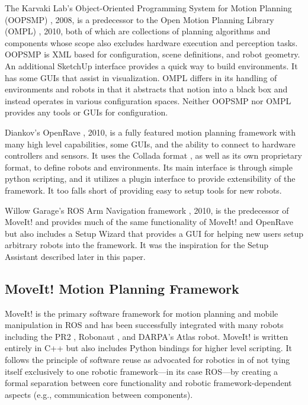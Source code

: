 \documentclass[10pt,journal,compsoc]{joser1}
\begin{document}
{The Karvaki Lab's Object-Oriented Programming System for Motion Planning
(OOPSMP) \cite{oopsmp}, 2008, is a predecessor to the Open Motion Planning
Library (OMPL) \cite{sucan2012the-open-motion-planning-library}, 2010, both of
which are collections of planning algorithms and components whose scope also
excludes hardware execution and perception tasks. OOPSMP is XML based for
configuration, scene definitions, and robot geometry. An additional SketchUp
interface provides a quick way to build environments. It has some GUIs that
assist in visualization. OMPL differs in its handling of environments and robots
in that it abstracts that notion into a black box and instead operates in
various configuration spaces. Neither OOPSMP nor OMPL provides any tools or GUIs
for configuration.

Diankov's OpenRave \cite{diankov2008openrave}, 2010, is a fully featured motion
planning framework with many high level capabilities, some GUIs, and the ability
to connect to hardware controllers and sensors. It uses the Collada format
\cite{collada}, as well as its own proprietary format, to define robots and
environments. Its main interface is through simple python scripting, and it
utilizes a plugin interface to provide extensibility of the framework. It too
falls short of providing easy to setup tools for new robots. 

Willow Garage's ROS Arm Navigation framework \cite{chitta2012perception}, 2010,
is the predecessor of MoveIt! and provides much of the same functionality of
MoveIt! and OpenRave but also includes a Setup Wizard that provides a GUI for
helping new users setup arbitrary robots into the framework. It was the
inspiration for the Setup Assistant described later in this paper.
\subsection{MoveIt! Motion Planning Framework}
\label{sec::moveit}

MoveIt!\cite{moveit} is the primary software framework for motion planning and
mobile manipulation in ROS and has been successfully integrated with many robots
including the PR2 \cite{wyrobek2008towards}, Robonaut
\cite{ambrose2000robonaut}, and DARPA's Atlas robot. MoveIt! is written entirely
in C++ but also includes Python bindings for higher level scripting. It follows
the principle of software reuse as advocated for robotics in
\cite{makarenko2007benefits} of not tying itself exclusively to one robotic
framework---in its case ROS---by creating a formal separation between core
functionality and robotic framework-dependent aspects (e.g., communication
between components).

}
\end{document}
